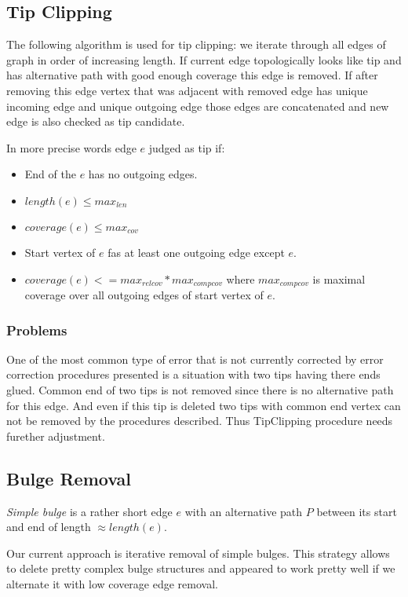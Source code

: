 \documentclass[12pt]{article}
\begin{document}
\subsection{Tip Clipping}

The following algorithm is used for tip clipping: we iterate through all edges of graph in order of increasing length. If current edge topologically looks like tip and has alternative path with good enough coverage this edge is removed. If after removing this edge vertex that was adjacent with removed edge has unique incoming edge and unique outgoing edge those edges are concatenated and new edge is also checked as tip candidate.

In more precise words edge $e$ judged as tip if:
\begin{itemize}
\item End of the $e$ has no outgoing edges.
\item $length(e) \le max_{len}$
\item $coverage(e) \le max_{cov}$
\item Start vertex of $e$ fas at least one outgoing edge except $e$.
\item $coverage(e) <= max_{relcov} * max_{compcov}$ where $max_{compcov}$ is maximal coverage over all outgoing edges of start vertex of $e$.
\end{itemize}

\subsubsection{Problems}
One of the most common type of error that is not currently corrected by error correction procedures presented is a situation with two tips having there ends glued. Common end of two tips is not removed since there is no alternative path for this edge. And even if this tip is deleted two tips with common end vertex can not be removed by the procedures described. Thus TipClipping procedure needs furether adjustment.

\subsection{Bulge Removal}
\textit{Simple bulge} is a rather short edge $e$ with an alternative path $P$ between its start and end of length $\approx length(e)$.

Our current approach is iterative removal of simple bulges. This strategy allows to delete pretty complex bulge structures and appeared to work pretty well if we alternate it with low coverage edge removal.
\end{document}
